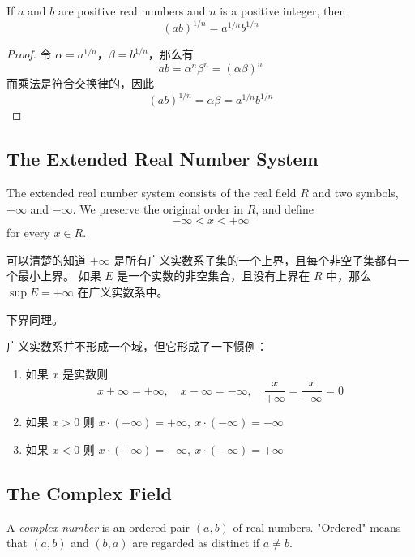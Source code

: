 \documentclass[../poma-notes.tex]{subfiles}
\begin{document}
\begin{corollary}
  If $a$ and $b$ are positive real numbers and $n$ is a positive integer, then
  \[(ab)^{1/n} = a^{1/n}b^{1/n}\]
\end{corollary}

\begin{proof}
  令 $\alpha = a^{1/n}$，$\beta = b^{1/n}$，那么有
  \[ab = \alpha^n \beta^n = (\alpha\beta)^n\]
  而乘法是符合交换律的，因此
  \[(ab)^{1/n} = \alpha\beta = a^{1/n}b^{1/n}\]
\end{proof}

\subsection*{The Extended Real Number System}

\setcounter{poma}{22}
\begin{definition}
  The extended real number system consists of the real field $R$ and two symbols, $+\infty$ and $-\infty$.
  We preserve the original order in $R$, and define
  \[-\infty < x < +\infty\]
  for every $x \in R$.
\end{definition}

可以清楚的知道 $+\infty$ 是所有广义实数系子集的一个上界，且每个非空子集都有一个最小上界。
如果 $E$ 是一个实数的非空集合，且没有上界在 $R$ 中，那么 $\sup E = + \infty$ 在广义实数系中。

下界同理。

广义实数系并不形成一个域，但它形成了一下惯例：

\begin{enumerate}[label=(\alph*)]
  \item 如果 $x$ 是实数则
        \[x+\infty=+\infty,\quad x-\infty=-\infty,\quad \frac{x}{+\infty}=\frac{x}{-\infty}=0\]
  \item 如果 $x>0$ 则 $x \cdot (+\infty) = +\infty,\ x \cdot (-\infty) = -\infty$
  \item 如果 $x<0$ 则 $x \cdot (+\infty) = -\infty,\ x \cdot (-\infty) = +\infty$
\end{enumerate}

\subsection*{The Complex Field}

\begin{definition}
  A \textit{complex number} is an ordered pair $(a, b)$ of real numbers. "Ordered" means that $(a, b)$ and $(b, a)$
  are regarded as distinct if $a \neq b$.
\end{definition}
\end{document}
